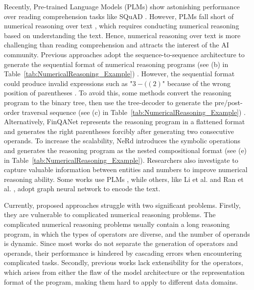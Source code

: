 \documentclass{article}
\begin{document}
Recently, Pre-trained Language Models (PLMs) \cite{BERT,RoBERTa,XLNet,GPT-3,T5} show astonishing performance over reading comprehension tasks like SQuAD \cite{squad}. However, PLMs fall short of numerical reasoning over text  \cite{NeRd}, which requires conducting numerical reasoning based on understanding the text. Hence, numerical reasoning over text is more challenging than reading comprehension \cite{ref_24} and attracts the interest of the AI community. Previous approaches adopt the sequence-to-sequence architecture to generate the sequential format of numerical reasoning programs (see (b) in Table~\ref{tab:NumericalReasoning_Example}) \cite{Math23K, ref_22}. However, the sequential format could produce invalid expressions such as "\(3-((2)\)" because of the wrong position of parentheses \cite{ref_11}. To avoid this, some methods convert the reasoning program to the binary tree, then use the tree-decoder to generate the pre/post-order traversal sequence (see (c) in Table~\ref{tab:NumericalReasoning_Example}) \cite{ref_23, ref_13, ref_28}. Alternatively, FinQANet \cite{finqa} represents the reasoning program in a flattened format and generates the right parentheses forcibly after generating two consecutive operands. To increase the scalability, NeRd \cite{NeRd} introduces the symbolic operations and generates the reasoning program as the nested compositional format (see (e) in Table~\ref{tab:NumericalReasoning_Example}). Researchers also investigate to capture valuable information between entities and numbers to improve numerical reasoning ability. Some works use PLMs \cite{ref_24, NeRd, MWP-BERT}, while others, like Li et al. \cite{Graph2Tree} and Ran et al. \cite{NumNet}, adopt graph neural network to encode the text.

Currently, proposed approaches struggle with two significant problems. Firstly, they are vulnerable to complicated numerical reasoning problems. The complicated numerical reasoning problems usually contain a long reasoning program, in which the types of operators are diverse, and the number of operands is dynamic. Since most works do not separate the generation of operators and operands, their performance is hindered by cascading errors when encountering complicated tasks. Secondly, previous works lack extensibility for the operators, which arises from either the flaw of the model architecture or the representation format of the program, making them hard to apply to different data domains.
\end{document}
